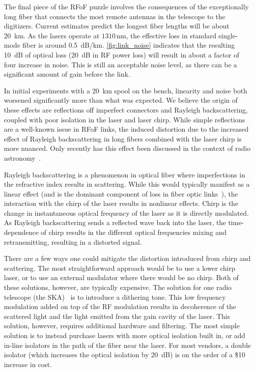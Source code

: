 The final piece of the RFoF puzzle involves the consequences of the exceptionally long fiber that connects the most remote antennas in the telescope to the digitizers.
Current estimates predict the longest fiber lengths will be about \qty{20}{\km}.
As the lasers operate at $1310\,\text{nm}$, the effective loss in standard single-mode fiber is around \qty{0.5}{\dB/\km}.
\autoref{fig:link_noise} indicates that the resulting \qty{10}{\dB} of optical loss (\qty{20}{\dB} in RF power loss) will result in about a factor of four increase in noise.
This is still an acceptable noise level, as there can be a significant amount of gain before the link.

In initial experiments with a \qty{20}{\km} spool on the bench, linearity and noise both worsened significantly more than what was expected.
We believe the origin of these effects are reflections off imperfect connectors and Rayleigh backscattering, coupled with poor isolation in the laser and laser chirp.
While simple reflections are a well-known issue in RFoF links, the induced distortion due to the increased effect of Rayleigh backscattering in long fibers combined with the laser chirp is more nuanced.
Only recently has this effect been discussed in the context of radio astronomy~\cite{periniRadioFrequencyFiber2022,nanniControllingRayleighBackscatteringInducedDistortion2020}.

Rayleigh backscattering is a phenomenon in optical fiber where imperfections in the refractive index results in scattering.
While this would typically manifest as a linear effect (and is the dominant component of loss in fiber optic links~\cite{kanamoriTransmissionLossOptical2021}), the interaction with the chirp of the laser results in nonlinear effects.
Chirp is the change in instantaneous optical frequency of the laser as it is directly modulated.
As Rayleigh backscattering sends a reflected wave back into the laser, the time-dependence of chirp results in the different optical frequencies mixing and retransmitting, resulting in a distorted signal.

There are a few ways one could mitigate the distortion introduced from chirp and scattering.
The most straightforward approach would be to use a lower chirp laser, or to use an external modulator where there would be no chirp.
Both of these solutions, however, are typically expensive.
The solution for one radio telescope (the SKA)~\cite{nanniControllingRayleighBackscatteringInducedDistortion2020} is to introduce a dithering tone.
This low frequency modulation added on top of the RF modulation results in decoherence of the scattered light and the light emitted from the gain cavity of the laser.
This solution, however, requires additional hardware and filtering.
The most simple solution is to instead purchase lasers with more optical isolation built in, or add in-line isolators in the path of the fiber near the laser.
For most vendors, a double isolator (which increases the optical isolation by \qty{20}{\dB}) is on the order of a \$10 increase in cost.

